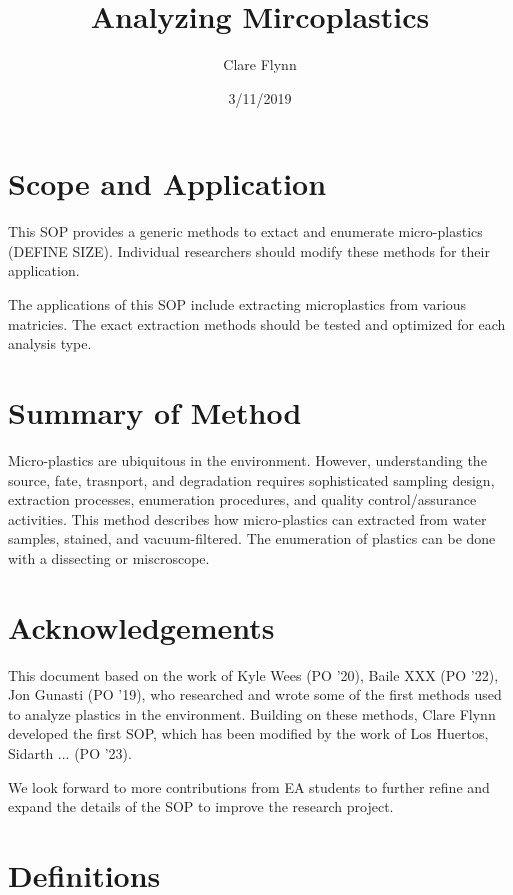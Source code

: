 \documentclass[12pt]{../SOP4_alpha}\usepackage[]{graphicx}\usepackage[]{color}
\title{Analyzing Mircoplastics}
\date{3/11/2019}
\author{Clare Flynn}
\begin{document}
\maketitle

\section{Scope and Application}

\NP This SOP provides a generic methods to extact and enumerate micro-plastics (DEFINE SIZE). Individual researchers should modify these methods for their application. 

\NP The applications of this SOP include extracting microplastics from various matricies. The exact extraction methods should be tested and optimized for each analysis type.

\section{Summary of Method}

\NP Micro-plastics are ubiquitous in the environment. However, understanding the source, fate, trasnport, and degradation requires sophisticated sampling design, extraction processes, enumeration procedures, and quality control/assurance activities. This method describes how micro-plastics can extracted from water samples, stained, and vacuum-filtered. The enumeration of plastics can be done with a dissecting or miscroscope. 

\tableofcontents

\newpage

\section{Acknowledgements}

This document based on the work of Kyle Wees (PO '20), Baile XXX (PO '22), Jon Gunasti (PO '19), who researched and wrote some of the first methods used to analyze plastics in the environment. Building on these methods, Clare Flynn developed the first SOP, which has been modified by the work of Los Huertos, Sidarth ... (PO '23). 

We look forward to more contributions from EA students to further refine and expand the details of the SOP to improve the research project.

\section{Definitions}
\end{document}
